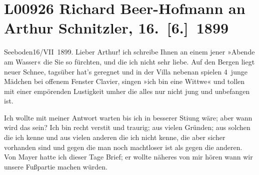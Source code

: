 

\section[Richard Beer-Hofmann an Arthur Schnitzler, 16. {[}6.{]} 1899]{L00926 Richard Beer-Hofmann an Arthur Schnitzler, 16. {[}6.{]} 1899}
\nopagebreak{}
\rehead{ }\normalsize\beginnumbering{}
\toendnotes[C]{\smallbreak\pagebreak[2]}
\toendnotes[C]{\smallbreak}
\toendnotes[C]{\smallbreak}
\pstart
           \raggedleft{}{\pb}Seeboden16/VII 1899.\pend
           \vspace{0.5em}
\pstart
           Lieber Arthur! ich schreibe Ihnen an einem jener »Abende am Wasser«
               die Sie so fürchten, und die ich nicht sehr liebe. Auf den Bergen liegt neuer Schnee,
               tagsüber hat’s geregnet und in der Villa nebenan spielen 4 junge Mäd{\pb}chen bei offenem Fenster Clavier,
               singen »ich bin eine Wittwe« und tollen mit
               einer empörenden Lustigkeit umher die alles nur nicht jung und unbefangen ist.\pend
           
\pstart
           Ich wollte mit meiner Antwort warten bis ich in besserer Sti{\geminationm}ung wäre; aber wann {\pb}wird das sein? Ich bin recht
                  versti{\geminationm}t und traurig; aus vielen Gründen; aus solchen
                   die ich kenne und aus vielen anderen die ich
               nicht kenne, die aber sicher vorhanden sind und gegen die man noch machtloser {\pb}ist als gegen die anderen. Von Mayer hatte ich dieser Tage Brief; er wollte
               näheres von mir hören wann wir unsere Fußpartie machen würden.\pend
           

